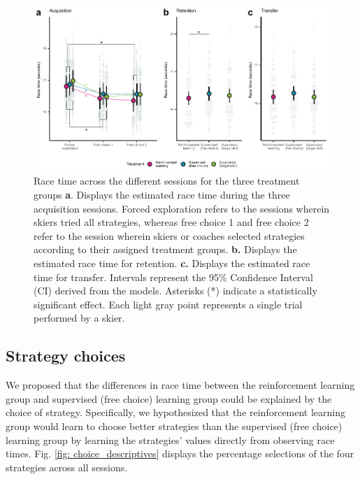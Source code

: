 \documentclass[pdflatex,sn-nature]{sn-jnl}%
\theoremstyle{thmstyleone}%
\theoremstyle{thmstyletwo}%
\theoremstyle{thmstylethree}%
\begin{document}
\begin{figure}[H]
\centering
\includegraphics{figures/figure_racingtimes_2.pdf}
\caption{Race time across the different sessions for the three treatment groups \textbf{a}. Displays the estimated race time during the three acquisition sessions. Forced exploration refers to the sessions wherein skiers tried all strategies, whereas free choice 1 and free choice 2 refer to the session wherein skiers or coaches selected strategies according to their assigned treatment groups. \textbf{b.} Displays the estimated race time for retention. \textbf{c.} Displays the estimated race time for transfer. Intervals represent the 95\% Confidence Interval (CI) derived from the models. Asterisks (*) indicate a statistically significant effect. Each light gray point represents a single trial performed by a skier.}
\label{fig: racetime}
\end{figure}


\subsection{Strategy choices}\label{result_strategychoice}
We proposed that the differences in race time between the reinforcement learning group and supervised (free choice) learning group could be explained by the choice of strategy. Specifically, we hypothesized that the reinforcement learning group would learn to choose better strategies than the supervised (free choice) learning group by learning the strategies' values directly from observing race times. Fig. \ref{fig: choice_descriptives} displays the percentage selections of the four strategies across all sessions.
\end{document}
